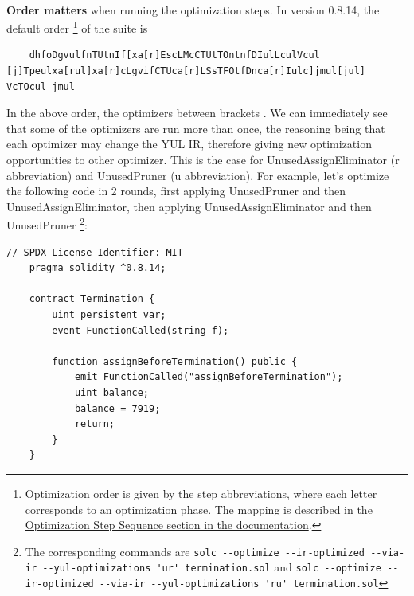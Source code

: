 \paragraph*{}
\textbf{Order matters} when running the optimization steps. In version 0.8.14, the default order \footnote{Optimization order is given by the step abbreviations, where each letter corresponds to an optimization phase. The mapping is described in the \href{https://docs.soliditylang.org/en/v0.8.14/yul.html}{Optimization Step Sequence section in the documentation}.} of the suite is

\begin{lstlisting}
    dhfoDgvulfnTUtnIf[xa[r]EscLMcCTUtTOntnfDIulLculVcul [j]Tpeulxa[rul]xa[r]cLgvifCTUca[r]LSsTFOtfDnca[r]Iulc]jmul[jul] VcTOcul jmul
\end{lstlisting}

In the above order, the optimizers between brackets \cite[will be applied multiple times in a loop until the Yul code remains unchanged or until the maximum number of rounds (currently 12)]{solidity-yul-optimizer}. We can immediately see that some of the optimizers are run more than once, the reasoning being that each optimizer may change the YUL IR, therefore giving new optimization opportunities to other optimizer. This is the case for UnusedAssignEliminator (r abbreviation) and UnusedPruner (u abbreviation). For example, let's optimize the following code in 2 rounds, first applying UnusedPruner and then UnusedAssignEliminator, then applying UnusedAssignEliminator and then UnusedPruner \footnote{The corresponding commands are \lstinline[columns=fixed]{solc --optimize --ir-optimized --via-ir --yul-optimizations 'ur' termination.sol} and \lstinline[columns=fixed]{solc --optimize --ir-optimized --via-ir --yul-optimizations 'ru' termination.sol}}:


\label{code:solidity-redundant-assignment}
\begin{lstlisting}[language=Solidity, caption=Example of a smart contract with a redundant assignment and variable declaration]
    // SPDX-License-Identifier: MIT
    pragma solidity ^0.8.14;

    contract Termination {
        uint persistent_var;
        event FunctionCalled(string f);

        function assignBeforeTermination() public {
            emit FunctionCalled("assignBeforeTermination");
            uint balance;
            balance = 7919;
            return;
        }
    }
\end{lstlisting}


